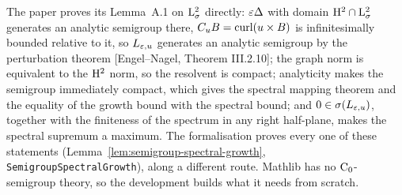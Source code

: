 The paper proves its Lemma~A.1 on $\mathrm{L}^2_\sigma$ directly: $\varepsilon\Delta$ with domain
$\mathrm{H}^2\cap\mathrm{L}^2_\sigma$ generates an analytic semigroup there, $C_uB=\operatorname{curl}(u\times B)$ is
infinitesimally bounded relative to it, so $L_{\varepsilon,u}$ generates an analytic semigroup by
the perturbation theorem [Engel--Nagel, Theorem III.2.10]; the graph norm is equivalent to
the $\mathrm{H}^2$ norm, so the resolvent is compact; analyticity makes the semigroup immediately
compact, which gives the spectral mapping theorem and the equality of the growth bound with
the spectral bound; and $0\in\sigma(L_{\varepsilon,u})$, together with the finiteness of the
spectrum in any right half-plane, makes the spectral supremum a maximum.  The formalisation
proves every one of these statements (Lemma~\ref{lem:semigroup-spectral-growth},
\texttt{SemigroupSpectralGrowth}), along a different route.  Mathlib has no
$\mathrm{C}_0$-semigroup theory, so the development builds what it needs from scratch.
